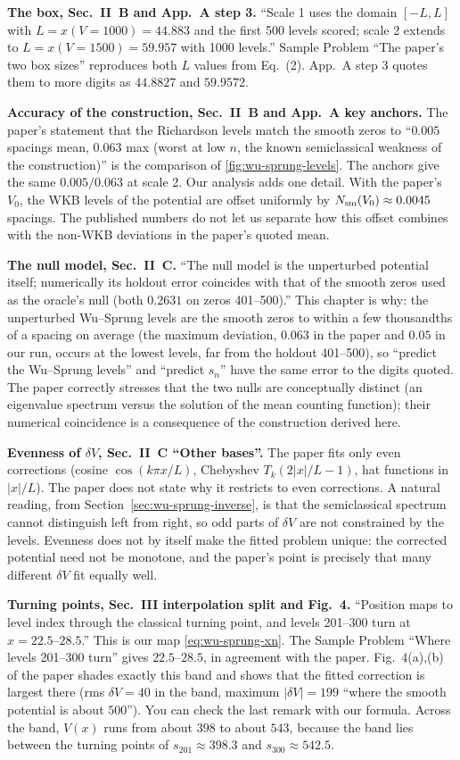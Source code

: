 \textbf{The box, Sec.~II~B and App.~A step 3.} ``Scale 1 uses the domain $[-L,L]$ with $L=x(V{=}1000)=44.883$ and the first 500 levels scored; scale 2 extends to $L=x(V{=}1500)=59.957$ with 1000 levels.'' Sample Problem ``The paper's two box sizes'' reproduces both $L$ values from Eq.~(2). App.~A step 3 quotes them to more digits as $44.8827$ and $59.9572$.

\textbf{Accuracy of the construction, Sec.~II~B and App.~A key anchors.} The paper's statement that the Richardson levels match the smooth zeros to ``$0.005$ spacings mean, $0.063$ max (worst at low $n$, the known semiclassical weakness of the construction)'' is the comparison of \cref{fig:wu-sprung-levels}. The anchors give the same $0.005/0.063$ at scale 2. Our analysis adds one detail. With the paper's $V_0$, the WKB levels of the potential are offset uniformly by $N_{\mathrm{sm}}(V_0)\approx0.0045$ spacings. The published numbers do not let us separate how this offset combines with the non-WKB deviations in the paper's quoted mean.

\textbf{The null model, Sec.~II~C.} ``The null model is the unperturbed potential itself; numerically its holdout error coincides with that of the smooth zeros used as the oracle's null (both $0.2631$ on zeros 401--500).'' This chapter is why: the unperturbed Wu--Sprung levels are the smooth zeros to within a few thousandths of a spacing on average (the maximum deviation, $0.063$ in the paper and $0.05$ in our run, occurs at the lowest levels, far from the holdout 401--500), so ``predict the Wu--Sprung levels'' and ``predict $s_n$'' have the same error to the digits quoted. The paper correctly stresses that the two nulls are conceptually distinct (an eigenvalue spectrum versus the solution of the mean counting function); their numerical coincidence is a consequence of the construction derived here.

\textbf{Evenness of $\delta V$, Sec.~II~C ``Other bases''.} The paper fits only even corrections (cosine $\cos(k\pi x/L)$, Chebyshev $T_k(2|x|/L-1)$, hat functions in $|x|/L$). The paper does not state why it restricts to even corrections. A natural reading, from Section~\ref{sec:wu-sprung-inverse}, is that the semiclassical spectrum cannot distinguish left from right, so odd parts of $\delta V$ are not constrained by the levels. Evenness does not by itself make the fitted problem unique: the corrected potential need not be monotone, and the paper's point is precisely that many different $\delta V$ fit equally well.

\textbf{Turning points, Sec.~III interpolation split and Fig.~4.} ``Position maps to level index through the classical turning point, and levels 201--300 turn at $x=22.5$--$28.5$.'' This is our map \eqref{eq:wu-sprung-xn}. The Sample Problem ``Where levels 201--300 turn'' gives $22.5$--$28.5$, in agreement with the paper. Fig.~4(a),(b) of the paper shades exactly this band and shows that the fitted correction is largest there (rms $\delta V=40$ in the band, maximum $|\delta V|=199$ ``where the smooth potential is about $500$''). You can check the last remark with our formula. Across the band, $V(x)$ runs from about $398$ to about $543$, because the band lies between the turning points of $s_{201}\approx398.3$ and $s_{300}\approx542.5$.

